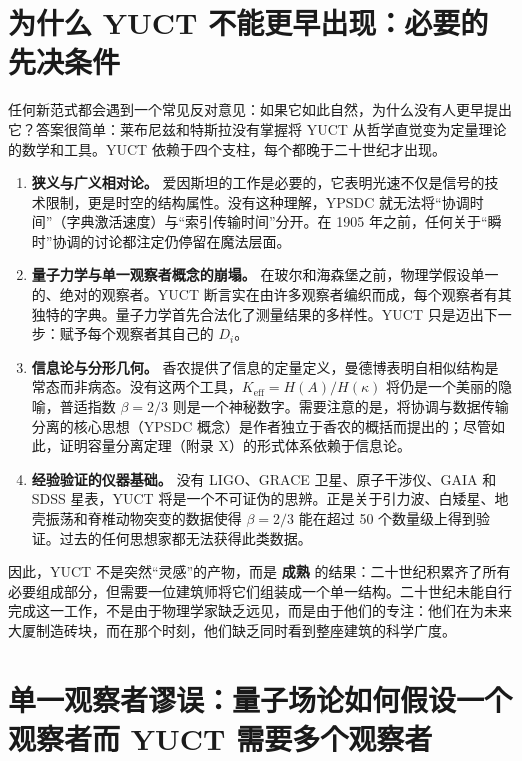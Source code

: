 \documentclass[12pt,a4paper]{article}
\begin{document}
	\section{为什么 YUCT 不能更早出现：必要的先决条件}
	\label{sec:prerequisites}
	
	任何新范式都会遇到一个常见反对意见：如果它如此自然，为什么没有人更早提出它？答案很简单：莱布尼兹和特斯拉没有掌握将 YUCT 从哲学直觉变为定量理论的数学和工具。YUCT 依赖于四个支柱，每个都晚于二十世纪才出现。
	
	\begin{enumerate}[leftmargin=*, label=\textbf{\arabic*.}]
		\item \textbf{狭义与广义相对论。} 爱因斯坦的工作是必要的，它表明光速不仅是信号的技术限制，更是时空的结构属性。没有这种理解，YPSDC 就无法将“协调时间”（字典激活速度）与“索引传输时间”分开。在 1905 年之前，任何关于“瞬时”协调的讨论都注定仍停留在魔法层面。
		
		\item \textbf{量子力学与单一观察者概念的崩塌。} 在玻尔和海森堡之前，物理学假设单一的、绝对的观察者。YUCT 断言实在由许多观察者编织而成，每个观察者有其独特的字典。量子力学首先合法化了测量结果的多样性。YUCT 只是迈出下一步：赋予每个观察者其自己的 \(D_i\)。
		
		\item \textbf{信息论与分形几何。} 香农提供了信息的定量定义，曼德博表明自相似结构是常态而非病态。没有这两个工具，\(K_{\mathrm{eff}} = H(A)/H(\kappa)\) 将仍是一个美丽的隐喻，普适指数 \(\beta=2/3\) 则是一个神秘数字。需要注意的是，将协调与数据传输分离的核心思想（YPSDC 概念）是作者独立于香农的概括而提出的；尽管如此，证明容量分离定理（附录 X）的形式体系依赖于信息论。
		
		\item \textbf{经验验证的仪器基础。} 没有 LIGO、GRACE 卫星、原子干涉仪、GAIA 和 SDSS 星表，YUCT 将是一个不可证伪的思辨。正是关于引力波、白矮星、地壳振荡和脊椎动物突变的数据使得 \(\beta=2/3\) 能在超过 50 个数量级上得到验证。过去的任何思想家都无法获得此类数据。
	\end{enumerate}
	
	因此，YUCT 不是突然“灵感”的产物，而是 \textbf{成熟} 的结果：二十世纪积累齐了所有必要组成部分，但需要一位建筑师将它们组装成一个单一结构。二十世纪未能自行完成这一工作，不是由于物理学家缺乏远见，而是由于他们的专注：他们在为未来大厦制造砖块，而在那个时刻，他们缺乏同时看到整座建筑的科学广度。
	
	\section{单一观察者谬误：量子场论如何假设一个观察者而 YUCT 需要多个观察者}
	
\end{document}

